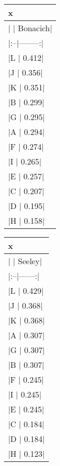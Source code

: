 \begin{table}[!h]
\centering
\centering
\begin{tabular}[t]{l}
\toprule
x\\
\midrule
|   | Bonacich|\\
|:--|--------:|\\
|L  |    0.412|\\
|J  |    0.356|\\
|K  |    0.351|\\
|B  |    0.299|\\
|G  |    0.295|\\
|A  |    0.294|\\
|F  |    0.274|\\
|I  |    0.265|\\
|E  |    0.257|\\
|C  |    0.207|\\
|D  |    0.195|\\
|H  |    0.158|\\
\bottomrule
\end{tabular}
\centering
\begin{tabular}[t]{l}
\toprule
x\\
\midrule
|   | Seeley|\\
|:--|------:|\\
|L  |  0.429|\\
|J  |  0.368|\\
|K  |  0.368|\\
|A  |  0.307|\\
|G  |  0.307|\\
|B  |  0.307|\\
|F  |  0.245|\\
|I  |  0.245|\\
|E  |  0.245|\\
|C  |  0.184|\\
|D  |  0.184|\\
|H  |  0.123|\\
\bottomrule
\end{tabular}
\end{table}
